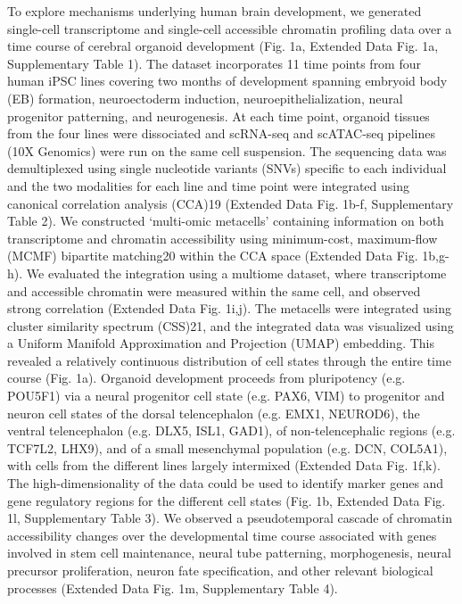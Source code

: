 To explore mechanisms underlying human brain development, we generated single-cell transcriptome and single-cell accessible chromatin profiling data over a time course of cerebral organoid development (Fig. 1a, Extended Data Fig. 1a, Supplementary Table 1). The dataset incorporates 11 time points from four human iPSC lines covering two months of development spanning embryoid body (EB) formation, neuroectoderm induction, neuroepithelialization, neural progenitor patterning, and neurogenesis. At each time point, organoid tissues from the four lines were dissociated and scRNA-seq and scATAC-seq pipelines (10X Genomics) were run on the same cell suspension. The sequencing data was demultiplexed using single nucleotide variants (SNVs) specific to each individual and the two modalities for each line and time point were integrated using canonical correlation analysis (CCA)19 (Extended Data Fig. 1b-f, Supplementary Table 2). We constructed ‘multi-omic metacells’ containing information on both transcriptome and chromatin accessibility using minimum-cost, maximum-flow (MCMF) bipartite matching20 within the CCA space (Extended Data Fig. 1b,g-h). We evaluated the integration using a multiome dataset, where transcriptome and accessible chromatin were measured within the same cell, and observed strong correlation (Extended Data Fig. 1i,j). The metacells were integrated using cluster similarity spectrum (CSS)21, and the integrated data was visualized using a Uniform Manifold Approximation and Projection (UMAP) embedding. This revealed a relatively continuous distribution of cell states through the entire time course (Fig. 1a). Organoid development proceeds from pluripotency (e.g. POU5F1) via a neural progenitor cell state (e.g. PAX6, VIM) to progenitor and neuron cell states of the dorsal telencephalon (e.g. EMX1, NEUROD6), the ventral telencephalon (e.g. DLX5, ISL1, GAD1), of non-telencephalic regions (e.g. TCF7L2, LHX9), and of a small mesenchymal population (e.g. DCN, COL5A1), with cells from the different lines largely intermixed (Extended Data Fig. 1f,k). The high-dimensionality of the data could be used to identify marker genes and gene regulatory regions for the different cell states (Fig. 1b, Extended Data Fig. 1l, Supplementary Table 3). We observed a pseudotemporal cascade of chromatin accessibility changes over the developmental time course associated with genes involved in stem cell maintenance, neural tube patterning, morphogenesis, neural precursor proliferation, neuron fate specification, and other relevant biological processes (Extended Data Fig. 1m, Supplementary Table 4).

